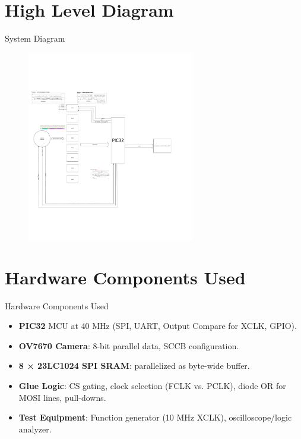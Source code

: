 \documentclass{beamer}
\begin{document}
\section{High Level Diagram}
\begin{frame}{System Diagram}
  \begin{figure}[H]
    \centering
    \includegraphics[width=0.65\textwidth]{SystemDiagram.pdf}
  \end{figure}
\end{frame}

\section{Hardware Components Used}
\begin{frame}{Hardware Components Used}
\begin{itemize}
  \item \textbf{PIC32} MCU at 40 MHz (SPI, UART, Output Compare for XCLK, GPIO).
  \item \textbf{OV7670 Camera}: 8-bit parallel data, SCCB configuration.
  \item \textbf{8 × 23LC1024 SPI SRAM}: parallelized as byte-wide buffer.
  \item \textbf{Glue Logic}: CS gating, clock selection (FCLK vs. PCLK), diode OR for MOSI lines, pull-downs.
  \item \textbf{Test Equipment}: Function generator (10 MHz XCLK), oscilloscope/logic analyzer.
\end{itemize}
\end{frame}
\end{document}
